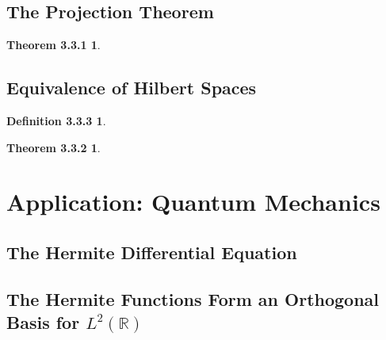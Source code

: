 \documentclass{article}
\theoremstyle{plain}
\newtheorem*{theorem331*}{Theorem 3.3.1}
\newtheorem*{definition333*}{Definition 3.3.3}
\newtheorem*{theorem332*}{Theorem 3.3.2}
\begin{document}
\subsection*{The Projection Theorem}

\begin{theorem331*}  \\
\end{theorem331*}

\subsection*{Equivalence of Hilbert Spaces}

\begin{definition333*} 
\end{definition333*}

\begin{theorem332*}
\end{theorem332*}

\section*{Application: Quantum Mechanics}
\subsection*{The Hermite Differential Equation}
\subsection*{The Hermite Functions Form an Orthogonal Basis for $ L^{2}\left(\mathbb{R}\right) $}
\end{document}
